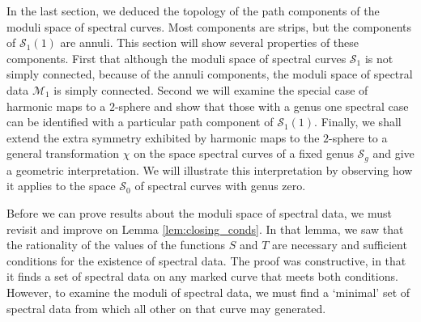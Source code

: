 In the last section, we deduced the topology of the path components of the moduli space of spectral curves. Most components are strips, but the components of $\mathcal{S}_1(1)$ are annuli. This section will show several properties of these components. First that although the moduli space of spectral curves $\mathcal{S}_1$ is not simply connected, because of the annuli components, the moduli space of spectral data $\mathcal{M}_1$ is simply connected. Second we will examine the special case of harmonic maps to a $2$-sphere and show that those with a genus one spectral case can be identified with a particular path component of $\mathcal{S}_1(1)$. Finally, we shall extend the extra symmetry exhibited by harmonic maps to the $2$-sphere to a general transformation $χ$ on the space spectral curves of a fixed genus $\mathcal{S}_g$ and give a geometric interpretation. We will illustrate this interpretation by observing how it applies to the space $\mathcal{S}_0$ of spectral curves with genus zero.

Before we can prove results about the moduli space of spectral data, we must revisit and improve on Lemma \ref{lem:closing_conds}. In that lemma, we saw that the rationality of the values of the functions $S$ and $T$ are necessary and sufficient conditions for the existence of spectral data. The proof was constructive, in that it finds a set of spectral data on any marked curve that meets both conditions. However, to examine the moduli of spectral data, we must find a `minimal' set of spectral data from which all other on that curve may generated.

